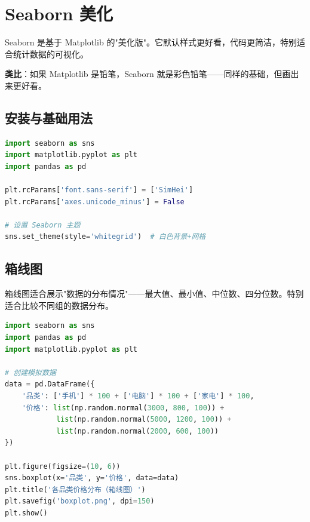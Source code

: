 \documentclass[12pt,a4paper]{article}
\begin{document}
\section{Seaborn 美化}

\begin{knowledgebox}
Seaborn 是基于 Matplotlib 的"美化版"。它默认样式更好看，代码更简洁，特别适合统计数据的可视化。

\textbf{类比}：如果 Matplotlib 是铅笔，Seaborn 就是彩色铅笔——同样的基础，但画出来更好看。
\end{knowledgebox}

\subsection{安装与基础用法}

\begin{lstlisting}[language=Python]
import seaborn as sns
import matplotlib.pyplot as plt
import pandas as pd

plt.rcParams['font.sans-serif'] = ['SimHei']
plt.rcParams['axes.unicode_minus'] = False

# 设置 Seaborn 主题
sns.set_theme(style='whitegrid')  # 白色背景+网格
\end{lstlisting}

\subsection{箱线图}

\begin{theorybox}[箱线图适合什么场景？]
箱线图适合展示"数据的分布情况"——最大值、最小值、中位数、四分位数。特别适合比较不同组的数据分布。
\end{theorybox}

\begin{lstlisting}[language=Python]
import seaborn as sns
import pandas as pd
import matplotlib.pyplot as plt

# 创建模拟数据
data = pd.DataFrame({
    '品类': ['手机'] * 100 + ['电脑'] * 100 + ['家电'] * 100,
    '价格': list(np.random.normal(3000, 800, 100)) +
            list(np.random.normal(5000, 1200, 100)) +
            list(np.random.normal(2000, 600, 100))
})

plt.figure(figsize=(10, 6))
sns.boxplot(x='品类', y='价格', data=data)
plt.title('各品类价格分布（箱线图）')
plt.savefig('boxplot.png', dpi=150)
plt.show()
\end{lstlisting}
\end{document}
